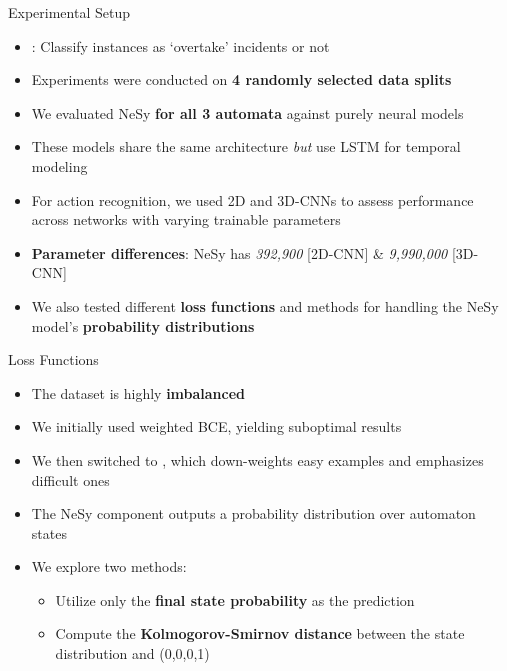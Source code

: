 \documentclass[10pt, aspectratio=169]{beamer}
\begin{document}
\begin{frame}{Experimental Setup}
    \begin{itemize}
    \setlength{\itemsep}{10pt}
    \item {}: Classify instances as `overtake' incidents or not
    \item Experiments were conducted on \textbf{4 randomly selected data splits}
    \item We evaluated NeSy \textbf{for all 3 automata} against \textcolor{umBlueLighter}{purely neural models}
    \item These models share the same architecture \textit{but} use LSTM for temporal modeling
    \item For action recognition, we used 2D and 3D-CNNs to assess performance across networks with varying trainable parameters
    \item \textbf{Parameter differences}: NeSy has \textit{392,900} [2D-CNN] \& \textit{9,990,000} [3D-CNN]
    \item We also tested different \textbf{loss functions} and methods for handling the NeSy model's \textbf{probability distributions}
\end{itemize}
\end{frame}

\begin{frame}{Loss Functions}
    \begin{itemize}
    \setlength{\itemsep}{12pt}
    \item The dataset is highly \textbf{imbalanced}
    \item We initially used weighted BCE, yielding suboptimal results
    \item We then switched to , which down-weights easy examples and emphasizes difficult ones
    \item The NeSy component outputs a \textcolor{umBlueLighter}{probability distribution} over automaton states
    \item We explore two methods:
    \vspace{5pt}
    \begin{itemize}
        \setlength{\itemsep}{3pt}
        \item Utilize only the \textbf{final state probability} as the prediction
        \item Compute the \textbf{Kolmogorov-Smirnov distance} between the state distribution and (0,0,0,1)
    \end{itemize}
    \end{itemize}
\end{frame}
\end{document}
